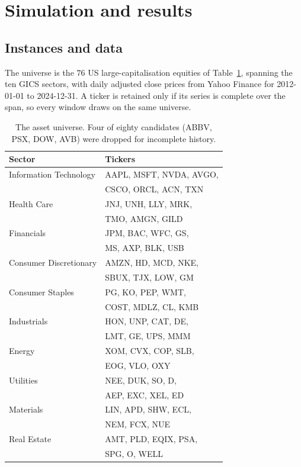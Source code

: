 \section{\label{sec:results}Simulation and results}

\subsection{\label{sec:data}Instances and data}
The universe is the $76$ US large-capitalisation equities of Table~\ref{tab:universe}, spanning the ten GICS sectors, with daily adjusted close prices from Yahoo Finance for 2012-01-01 to 2024-12-31. A ticker is retained only if its series is complete over the span, so every window draws on the same universe.

\begin{table}[t]
  \caption{The asset universe. Four of eighty candidates (ABBV, PSX,
DOW, AVB) were dropped for incomplete history.}
  \label{tab:universe}
\footnotesize
  \begin{ruledtabular}
  \begin{tabular}{ll}
Sector & Tickers \\ \hline
    Information Technology & AAPL, MSFT, NVDA, AVGO, \\
                           & CSCO, ORCL, ACN, TXN \\
    Health Care            & JNJ, UNH, LLY, MRK, \\
                           & TMO, AMGN, GILD \\
    Financials             & JPM, BAC, WFC, GS, \\
                           & MS, AXP, BLK, USB \\
    Consumer Discretionary & AMZN, HD, MCD, NKE, \\
                           & SBUX, TJX, LOW, GM \\
    Consumer Staples       & PG, KO, PEP, WMT, \\
                           & COST, MDLZ, CL, KMB \\
    Industrials            & HON, UNP, CAT, DE, \\
                           & LMT, GE, UPS, MMM \\
    Energy                 & XOM, CVX, COP, SLB, \\
                           & EOG, VLO, OXY \\
    Utilities              & NEE, DUK, SO, D, \\
                           & AEP, EXC, XEL, ED \\
    Materials              & LIN, APD, SHW, ECL, \\
                           & NEM, FCX, NUE \\
    Real Estate            & AMT, PLD, EQIX, PSA, \\
                           & SPG, O, WELL \\
  \end{tabular}
  \end{ruledtabular}
\end{table}

